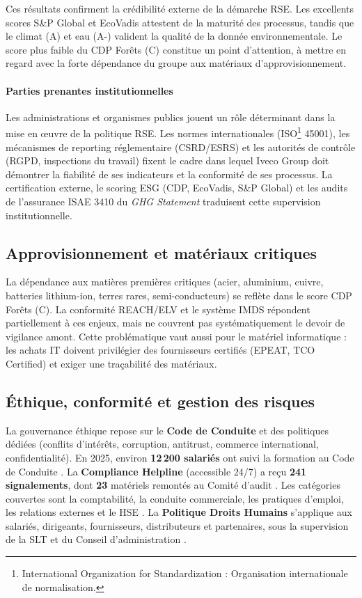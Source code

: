 Ces résultats confirment la crédibilité externe de la démarche RSE. Les excellents scores S\&P Global et EcoVadis attestent de la maturité des processus, tandis que le  climat (A) et eau (A-) valident la qualité de la donnée environnementale. Le score plus faible du CDP Forêts (C) constitue un point d'attention, à mettre en regard avec la forte dépendance du groupe aux matériaux d'approvisionnement.

\paragraph{Parties prenantes institutionnelles}
Les administrations et organismes publics jouent un rôle déterminant dans la mise en œuvre de la politique RSE. Les normes internationales (ISO\footnote{International Organization for Standardization : Organisation internationale de normalisation.} 45001), les mécanismes de reporting réglementaire (CSRD/ESRS) et les autorités de contrôle (RGPD, inspections du travail) fixent le cadre dans lequel Iveco Group doit démontrer la fiabilité de ses indicateurs et la conformité de ses processus. La certification externe, le scoring ESG (CDP, EcoVadis, S\&P Global) et les audits de l'assurance ISAE 3410 du \textit{GHG Statement} traduisent cette supervision institutionnelle.

\subsection{Approvisionnement et matériaux critiques}

La dépendance aux matières premières critiques (acier, aluminium, cuivre, batteries lithium-ion, terres rares, semi-conducteurs) se reflète dans le score CDP Forêts (C). La conformité REACH/ELV et le système IMDS répondent partiellement à ces enjeux, mais ne couvrent pas systématiquement le devoir de vigilance amont. Cette problématique vaut aussi pour le matériel informatique : les achats IT doivent privilégier des fournisseurs certifiés (EPEAT, TCO Certified) et exiger une traçabilité des matériaux.

\subsection{Éthique, conformité et gestion des risques}

La gouvernance éthique repose sur le \textbf{Code de Conduite} et des politiques dédiées (conflits d'intérêts, corruption, antitrust, commerce international, confidentialité). En 2025, environ \textbf{12\,200 salariés} ont suivi la formation au Code de Conduite \cite{iveco_annual_2025}. La \textbf{Compliance Helpline} (accessible 24/7) a reçu \textbf{241 signalements}, dont \textbf{23} matériels remontés au Comité d'audit \cite{iveco_annual_2025}. Les catégories couvertes sont la comptabilité, la conduite commerciale, les pratiques d'emploi, les relations externes et le HSE \cite{iveco_compliance_helpline_2025}. La \textbf{Politique Droits Humains} s'applique aux salariés, dirigeants, fournisseurs, distributeurs et partenaires, sous la supervision de la SLT et du Conseil d'administration \cite{iveco_annual_2025}.

